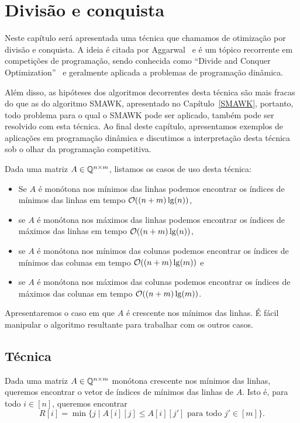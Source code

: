 \chapter{Divisão e conquista}
\label{DivConq}


Neste capítulo será apresentada uma técnica que chamamos de otimização por divisão e conquista. A ideia é citada por Aggarwal~\cite{Aggarwal:1987} e é um tópico recorrente em competições de programação, sendo conhecida como ``Divide and Conquer Optimization''~\cite{Quora:DivConq,CF:Optm} e geralmente aplicada a problemas de programação dinâmica. 

Além disso, as hipóteses dos algoritmos decorrentes desta técnica são mais fracas do que as do algoritmo SMAWK, apresentado no Capítulo~\ref{SMAWK}, portanto, todo problema para o qual o SMAWK pode ser aplicado, também pode ser resolvido com esta técnica. Ao final deste capítulo, apresentamos exemplos de aplicações em programação dinâmica e discutimos a interpretação desta técnica sob o olhar da programação competitiva.

Dada uma matriz $A \in \mathbb{Q}^{n \times m}$, listamos os casos de uso desta técnica:
\begin{itemize}
    \item Se $A$ é monótona nos mínimos das linhas podemos encontrar os índices de mínimos das linhas em tempo $\mathcal{O}((n+m)\lg(n))$, 
    \item se $A$ é monótona nos máximos das linhas podemos encontrar os índices de máximos das linhas em tempo $\mathcal{O}((n+m)\lg(n))$, 
    \item se $A$ é monótona nos mínimos das colunas podemos encontrar os índices de mínimos das colunas em tempo $\mathcal{O}((n+m)\lg(m))$ e 
    \item se $A$ é monótona nos máximos das colunas podemos encontrar os índices de máximos das colunas em tempo $\mathcal{O}((n+m)\lg(m))$.
\end{itemize}

Apresentaremos o caso em que $A$ é crescente nos mínimos das linhas. É fácil manipular o algoritmo resultante para trabalhar com os outros casos.


\section{Técnica}
Dada uma matriz $A \in \mathbb{Q}^{n \times m}$ monótona crescente nos mínimos das linhas, queremos encontrar o vetor de índices de mínimos das linhas de $A$. Isto é, para todo $i \in [n]$, queremos encontrar
$$ R[i] = \min\{j \mid A[i][j] \leq A[i][j'] \text{ para todo } j' \in [m]\} \text{.}$$  


